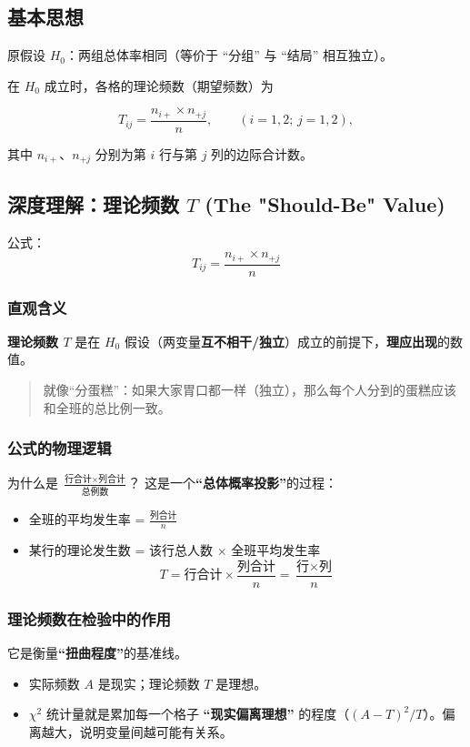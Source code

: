 \documentclass[lang=cn,10pt]{elegantbook}
\begin{document}
\subsection{基本思想}
原假设 $H_0$：两组总体率相同（等价于 ``分组'' 与 ``结局'' 相互独立）。

在 $H_0$ 成立时，各格的理论频数（期望频数）为

\[
  T_{ij}=\frac{n_{i+} \times n_{+j}}{n},\qquad (i=1,2;\,j=1,2),
\]

其中 $n_{i+}$、$n_{+j}$ 分别为第 $i$ 行与第 $j$ 列的边际合计数。

\subsection{深度理解：理论频数 $T$ (The "Should-Be" Value)}

公式：
$$T_{ij} = \frac{n_{i+} \times n_{+j}}{n}$$

\subsubsection{直观含义}
\textbf{理论频数 $T$} 是在 $H_0$ 假设（两变量\textbf{互不相干/独立}）成立的前提下，\textbf{理应出现}的数值。
\begin{quote}
    就像“分蛋糕”：如果大家胃口都一样（独立），那么每个人分到的蛋糕应该和全班的总比例一致。
\end{quote}

\subsubsection{公式的物理逻辑}
为什么是 $\frac{\text{行合计} \times \text{列合计}}{\text{总例数}}$？
这是一个\textbf{“总体概率投影”}的过程：
\begin{itemize}
    \item 全班的平均发生率 = $\frac{\text{列合计}}{n}$
    \item 某行的理论发生数 = 该行总人数 $\times$ 全班平均发生率
    \[ T = \text{行合计} \times \frac{\text{列合计}}{n} = \frac{\text{行} \times \text{列}}{n} \]
\end{itemize}

\subsubsection{理论频数在检验中的作用}
它是衡量\textbf{“扭曲程度”}的基准线。
\begin{itemize}
    \item 实际频数 $A$ 是现实；理论频数 $T$ 是理想。
    \item $\chi^2$ 统计量就是累加每一个格子 \textbf{“现实偏离理想”} 的程度（$(A-T)^2/T$）。偏离越大，说明变量间越可能有关系。
\end{itemize}
\end{document}
